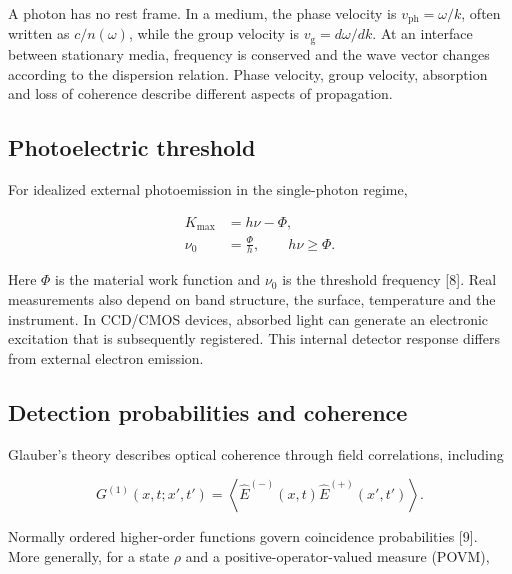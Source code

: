 \documentclass[11pt,a4paper]{article}
\begin{document}
A photon has no rest frame. In a medium, the phase velocity is \(v_{\mathrm{ph}}=\omega/k\), often written as \(c/n(\omega)\), while the group velocity is \(v_{\mathrm g}=d\omega/dk\). At an interface between stationary media, frequency is conserved and the wave vector changes according to the dispersion relation. Phase velocity, group velocity, absorption and loss of coherence describe different aspects of propagation.

\hypertarget{photoelectric-threshold}{%
\subsection{Photoelectric threshold}\label{photoelectric-threshold}}

For idealized external photoemission in the single-photon regime,

\begin{equation}\label{eq:10}
\begin{aligned}
K_{\max}&=h\nu-\Phi,\\
\nu_0&=\frac{\Phi}{h},\qquad h\nu\ge\Phi.
\end{aligned}
\end{equation}

Here \(\Phi\) is the material work function and \(\nu_0\) is the threshold frequency {[}8{]}. Real measurements also depend on band structure, the surface, temperature and the instrument. In CCD/CMOS devices, absorbed light can generate an electronic excitation that is subsequently registered. This internal detector response differs from external electron emission.

\hypertarget{detection-probabilities-and-coherence}{%
\subsection{Detection probabilities and coherence}\label{detection-probabilities-and-coherence}}

Glauber's theory describes optical coherence through field correlations, including

\begin{equation}\label{eq:11}
G^{(1)}(x,t;x',t')
=\left\langle\hat E^{(-)}(x,t)\hat E^{(+)}(x',t')\right\rangle.
\end{equation}

Normally ordered higher-order functions govern coincidence probabilities {[}9{]}. More generally, for a state \(\rho\) and a positive-operator-valued measure (POVM),
\end{document}
